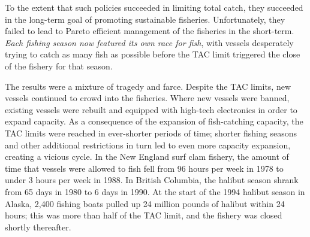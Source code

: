 To the extent that such policies succeeded in limiting total catch, they succeeded in the long-term goal of promoting sustainable fisheries. Unfortunately, they failed to lead to Pareto efficient management of the fisheries in the short-term. \emph{Each fishing season now featured its own race for fish}, with vessels desperately trying to catch as many fish as possible before the TAC limit triggered the close of the fishery for that season.

The results were a mixture of tragedy and farce. Despite the TAC limits, new vessels continued to crowd into the fisheries. Where new vessels were banned, existing vessels were rebuilt and equipped with high-tech electronics in order to expand capacity. As a consequence of the expansion of fish-catching capacity, the TAC limits were reached in ever-shorter periods of time; shorter fishing seasons and other additional restrictions in turn led to even more capacity expansion, creating a vicious cycle. %
In the New England surf clam fishery, the amount of time that vessels were allowed to fish fell from 96 hours per week in 1978 to under 3 hours per week in 1988. In British Columbia, the halibut season shrank from 65 days in 1980 to 6 days in 1990. At the start of the 1994 halibut season in Alaska, 2,400 fishing boats pulled up 24 million pounds of halibut within 24 hours; this was more than half of the TAC limit, and the fishery was closed shortly thereafter.


